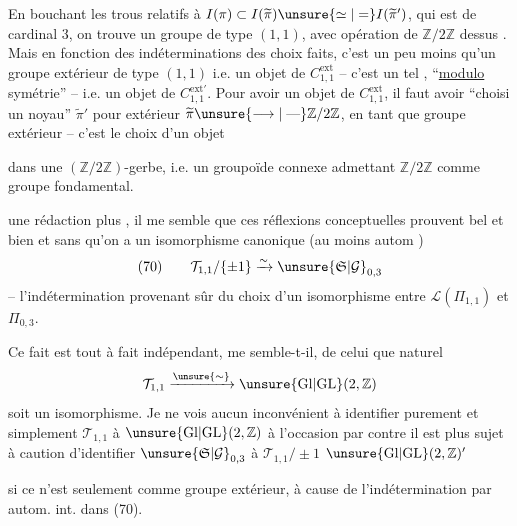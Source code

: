 En bouchant les trous relatifs à $I(\pi)\subset I(\widetilde{\pi})\unsure{\simeq|=}I(\widetilde{\pi}')$, qui est de cardinal $3$, on trouve un groupe  de type $(1,1)$, avec opération de $\mathbb Z/2\mathbb Z$ dessus . Mais en fonction des indéterminations des choix faits, c'est un peu moins qu'un groupe extérieur de type $(1,1)$ i.e. un objet de $C^{\mathrm{ext}}_{1,1}$ -- c'est un tel , ``\uline{modulo} symétrie'' -- i.e. un objet de $C^{\mathrm{ext}\prime}_{1,1}$. Pour avoir un objet de $C^{\mathrm{ext}}_{1,1}$, il faut avoir ``choisi un noyau'' $\widetilde{\pi}'$ pour  extérieur $\widetilde{\pi}\unsure{\longrightarrow|\mathrel{\text{---}}}\mathbb Z/2\mathbb Z$, en tant que groupe extérieur -- c'est le choix d'un objet


dans une $(\mathbb Z/2\mathbb Z)$-gerbe, i.e.  un groupoïde connexe admettant $\mathbb Z/2\mathbb Z$ comme groupe fondamental.

 une rédaction plus , il me semble que ces réflexions conceptuelles prouvent bel et bien et sans  qu'on a un isomorphisme canonique (au moins  autom )
\[
(70)\qquad \mathcal T_{1,1}/\{\pm1\}\xrightarrow{\sim}\unsure{\mathfrak S|\mathcal G}_{0,3}
\]
-- l'indétermination  provenant  sûr du choix d'un isomorphisme entre $\mathcal L(\Pi_{1,1})$ et $\Pi_{0,3}$.

Ce fait est tout à fait indépendant,  me semble-t-il, de celui que  naturel
\[
\mathcal T_{1,1}\xrightarrow{\unsure{\sim}}\unsure{\mathrm{Gl}|\mathrm{GL}}(2,\mathbb Z)
\]
soit un isomorphisme. Je ne vois aucun inconvénient à identifier purement et simplement $\mathcal T_{1,1}$ à $\unsure{\mathrm{Gl}|\mathrm{GL}}(2,\mathbb Z)$ à l'occasion\unsure{,|;} par contre il est plus sujet à caution d'identifier $\unsure{\mathfrak S|\mathcal G}_{0,3}$ à $\mathcal T_{1,1}/\pm1$  $\unsure{\mathrm{Gl}|\mathrm{GL}}(2,\mathbb Z)'$


si ce n'est seulement comme groupe extérieur, à cause de l'indétermination par autom. int. dans (70).

